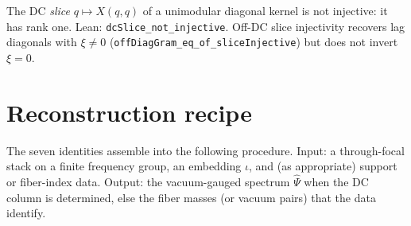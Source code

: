 \documentclass[11pt,a4paper]{article}
\theoremstyle{definition}
\theoremstyle{remark}
\begin{document}
The DC \emph{slice} $q\mapsto X(q,q)$ of a unimodular diagonal kernel
is not injective: it has rank one.
Lean: \texttt{dcSlice\_not\_injective}.
Off-DC slice injectivity recovers lag diagonals with $\xi\neq 0$
(\texttt{offDiagGram\_eq\_of\_sliceInjective}) but does not invert
$\xi=0$.

\section{Reconstruction recipe}
\label{sec:recipe}

The seven identities assemble into the following procedure.
Input: a through-focal stack on a finite frequency group, an embedding
$\iota$, and (as appropriate) support or fiber-index data.
Output: the vacuum-gauged spectrum $\hat\Psi$ when the DC column is
determined, else the fiber masses (or vacuum pairs) that the data
identify.
\end{document}
